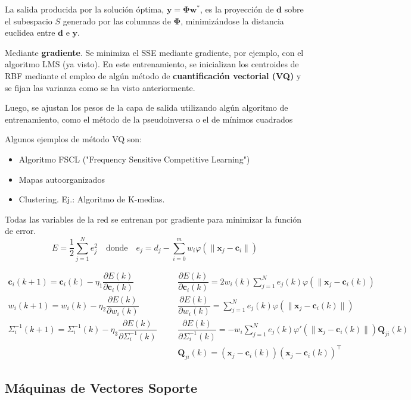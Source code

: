 La salida producida por la solución óptima, $\mathbf{y=\Phi w^*}$, es la proyección de $\mathbf{d}$ sobre el subespacio $S$ generado por las columnas de $\mathbf{\Phi}$, minimizándose la distancia euclidea entre $\mathbf{d}$ e $\mathbf{y}$.

Mediante \textbf{gradiente}. Se minimiza el SSE mediante gradiente, por ejemplo, con el algoritmo LMS (ya visto).
En este entrenamiento, se inicializan los centroides de RBF mediante el empleo de algún método de \textbf{cuantificación vectorial (VQ)} y se fijan las varianza como se ha visto anteriormente.

Luego, se ajustan los pesos de la capa de salida utilizando algún algoritmo de entrenamiento, como el método de la pseudoinversa o el de mínimos cuadrados

Algunos ejemplos de método VQ son:
\begin{itemize}
\item Algoritmo FSCL ("Frequency Sensitive Competitive Learning")
\item Mapas autoorganizados
\item Clustering. Ej.: Algoritmo de K-medias.
\end{itemize}
Todas las variables de la red se entrenan por gradiente para minimizar la función de error. \[ \boxed{E=\dfrac{1}{2}\sum_{j=1}^{N}e_j^2}\quad\mathrm{donde}\quad e_j=d_j-\sum_{i=0}^{m}w_i\varphi(\|\mathbf{x}_j-\mathbf{c}_i\|) \]

\[ \begin{array}{rcl}
	\mathbf{c}_i(k+1)=\mathbf{c}_i(k)-\eta_1\dfrac{\partial E(k)}{\partial \mathbf{c}_i(k)} & ~~~~ &\dfrac{\partial E(k)}{\partial \mathbf{c}_i(k)}=2w_i(k)\sum_{j=1}^Ne_j(k)\varphi(\|\mathbf{x}_j-\mathbf{c}_i(k)) \\
	w_{i}(k+1)=w_{i}(k)-\eta_{2}\dfrac{ \partial E(k) }{ \partial w_{i}(k) }  & &\dfrac{ \partial E(k) }{ \partial w_{i}(k) }=\sum_{j=1}^{N}e_{j}(k)\varphi(\|\mathbf{x}_{j}-\mathbf{c}_{i}(k) \|)  \\
	\Sigma_{i}^{-1}(k+1)=\Sigma_{i}^{-1}(k)-\eta_{3}\dfrac{ \partial E(k) }{ \partial \Sigma_{i}^{-1}(k) }  & &\dfrac{ \partial E(k) }{ \partial \Sigma_{i}^{-1}(k) } =-w_{i}\sum_{j=1}^{N}e_{j}(k)\varphi'(\|\mathbf{x}_{j}-\mathbf{c}_{i}(k)\|)\mathbf{Q}_{ji}(k) \\
	& & \mathbf{Q}_{ji}(k)=(\mathbf{x}_{j}-\mathbf{c}_{i}(k))(\mathbf{x}_{j}-\mathbf{c}_{i}(k))^{\intercal}
\end{array}  \]
\subsection{Máquinas de Vectores Soporte}
